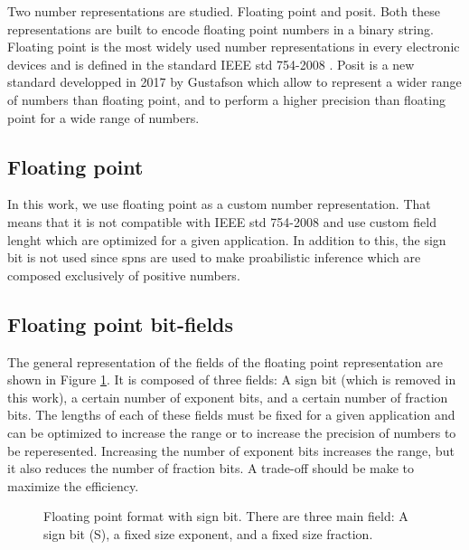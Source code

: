 Two number representations are studied. Floating point and posit. Both these representations are built to encode floating point numbers in a binary string. Floating point is the most widely used number representations in every electronic devices and is defined in the standard IEEE std 754-2008 \cite{float_std}. Posit is a new standard developped in 2017 by Gustafson \cite{posit_arithmetic} which allow to represent a wider range of numbers than floating point, and to perform a higher precision than floating point for a wide range of numbers.

\subsection{Floating point}

In this work, we use floating point as a custom number representation. That means that it is not compatible with IEEE std 754-2008 and use custom field lenght which are optimized for a given application. In addition to this, the sign bit is not used since \glspl{spn} are used to make proabilistic inference which are composed exclusively of positive numbers.

\subsection{Floating point bit-fields}

The general representation of the fields of the floating point representation are shown in Figure \ref{fig:float_repr}. It is composed of three fields: A sign bit (which is removed in this work), a certain number of exponent bits, and a certain number of fraction bits. The lengths of each of these fields must be fixed for a given application and can be optimized to increase the range or to increase the precision of numbers to be reperesented. Increasing the number of exponent bits increases the range, but it also reduces the number of fraction bits. A trade-off should be make to maximize the efficiency.

\begin{figure}
\begin{mdframed}
	\centering
	
	\caption{Floating point format with sign bit. There are three main field: A sign bit (S), a fixed size exponent, and a fixed size fraction.}
	\label{fig:float_repr}
\end{mdframed}
\end{figure}

